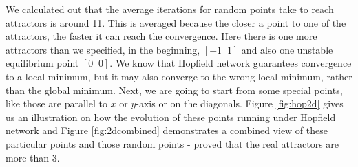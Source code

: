 \documentclass{article}
\begin{document}
We calculated out that the average iterations for random points take to reach attractors is around 11. This is averaged because the closer a point to one of the attractors, the faster it can reach the convergence. Here there is one more attractors than we specified, in the beginning, $[-1\;\;1]$ and also one unstable equilibrium point $[0\;\;0]$. We know that Hopfield network guarantees convergence to a local minimum, but it may also converge to the wrong local minimum, rather than the global minimum. Next, we are going to start from some special points, like those are parallel to $x$ or $y$-axis or on the diagonals. Figure \ref{fig:hop2d} gives us an illustration on how the evolution of these points running under Hopfield network and Figure \ref{fig:2dcombined} demonstrates a combined view of these particular points and those random points - proved that the real attractors are more than 3.
\end{document}
